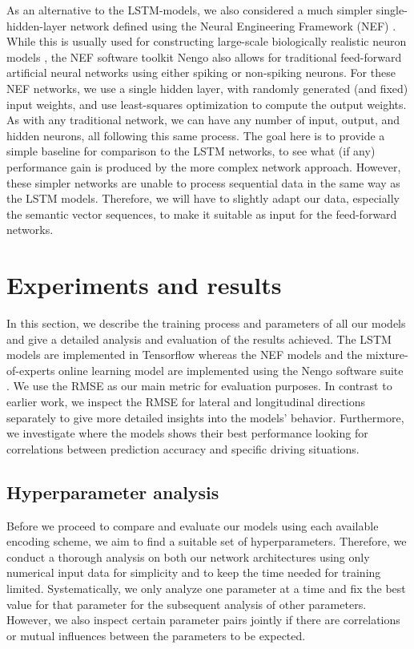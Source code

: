 As an alternative to the \ac{LSTM}-models, we also considered a much simpler single-hidden-layer network defined using the Neural Engineering Framework (\ac{NEF}) \cite{Eliasmith2003}.
While this is usually used for constructing large-scale biologically realistic neuron models \cite{Eliasmith2012}, the \ac{NEF} software toolkit \acs{Nengo} \cite{Bekolay2014} also allows for traditional feed-forward artificial neural networks using either spiking or non-spiking neurons.
For these \ac{NEF} networks, we use a single hidden layer, with randomly generated (and fixed) input weights, and use least-squares optimization to compute the output weights.
As with any traditional network, we can have any number of input, output, and hidden neurons, all following this same process.
The goal here is to provide a simple baseline for comparison to the \ac{LSTM} networks, to see what (if any) performance gain is produced by the more complex network approach.
However, these simpler networks are unable to process sequential data in the same way as the \ac{LSTM} models.
Therefore, we will have to slightly adapt our data, especially the semantic vector sequences, to make it suitable as input for the feed-forward networks.

\section{Experiments and results}
\label{sec:experiments}
In this section, we describe the training process and parameters of all our models and give a detailed analysis and evaluation of the results achieved.
The \ac{LSTM} models are implemented in Tensorflow \cite{Abadi2016} whereas the \ac{NEF} models and the mixture-of-experts online learning model are implemented using the \acs{Nengo} software suite \cite{Bekolay2014}.
We use the \ac{RMSE} as our main metric for evaluation purposes.
In contrast to earlier work, we inspect the \ac{RMSE} for lateral and longitudinal directions separately to give more detailed insights into the models' behavior.
Furthermore, we investigate where the models shows their best performance looking for correlations between prediction accuracy and specific driving situations.

\subsection{Hyperparameter analysis}
\label{subsec:hyperparam_analysis}
Before we proceed to compare and evaluate our models using each available encoding scheme, we aim to find a suitable set of hyperparameters.
Therefore, we conduct a thorough analysis on both our network architectures using only numerical input data for simplicity and to keep the time needed for training limited.
Systematically, we only analyze one parameter at a time and fix the best value for that parameter for the subsequent analysis of other parameters.
However, we also inspect certain parameter pairs jointly if there are correlations or mutual influences between the parameters to be expected.

